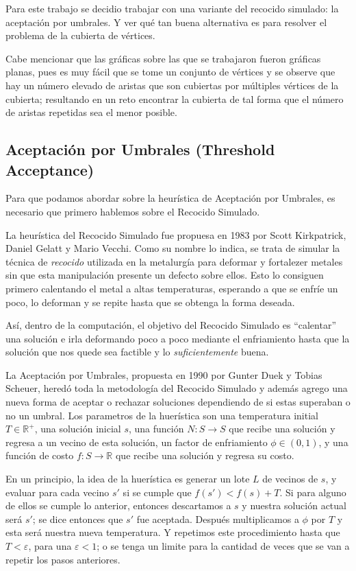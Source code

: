\documentclass{article}
\newcommand{\tit}[1]{\textit{#1}}
\begin{document}
  Para este trabajo se decidio trabajar con una variante del 
  recocido simulado: la aceptación por umbrales. Y ver qué tan
  buena alternativa es para resolver el problema de la cubierta
  de vértices. 

  Cabe mencionar que las gráficas sobre las que se trabajaron fueron 
  gráficas planas, pues es muy fácil que se tome un conjunto de vértices
  y se observe que hay un número elevado de aristas que son cubiertas por 
  múltiples vértices de la cubierta; resultando en un reto encontrar 
  la cubierta de tal forma que el número de aristas repetidas sea el 
  menor posible.

  \subsection{Aceptación por Umbrales (Threshold Acceptance)}
  Para que podamos abordar sobre la heurística de Aceptación por Umbrales,
  es necesario que primero hablemos sobre el Recocido Simulado.

  La heurística del Recocido Simulado fue propuesa en 1983 por
  Scott Kirkpatrick, Daniel Gelatt y Mario Vecchi. Como su nombre
  lo indica, se trata de simular la técnica de \tit{recocido}
  utilizada en la metalurgía para deformar y fortalezer metales sin 
  que esta manipulación presente un defecto sobre ellos. Esto lo 
  consiguen primero calentando el metal a altas temperaturas,
  esperando a que se enfríe un poco, lo deforman y se repite hasta
  que se obtenga la forma deseada.

  Así, dentro de la computación, el objetivo del Recocido Simulado
  es ``calentar'' una solución e irla deformando poco a poco 
  mediante el enfriamiento hasta que la solución que nos quede 
  sea factible y lo \tit{suficientemente} buena.

  La Aceptación por Umbrales, propuesta en 1990 por Gunter Duek y
  Tobias Scheuer, heredó toda la metodología del Recocido
  Simulado y además agrego una nueva forma de aceptar o rechazar
  soluciones dependiendo de si estas superaban o no un umbral.
  Los parametros de la huerística son una temperatura initial 
  $T \in \mathbb{R}^+$, una solución inicial $s$, una función 
  $N: S \rightarrow S$ que recibe una solución y regresa a un vecino 
  de esta solución,  un factor de enfriamiento $\phi \in (0, 1)$, y 
  una función de costo $f: S \rightarrow \mathbb{R}$ que recibe 
  una solución y regresa su costo.

  En un principio, la idea de la huerística es generar un lote $L$
  de vecinos de $s$, y evaluar para cada vecino $s'$ si se 
  cumple que $f(s') < f(s) + T$. Si para alguno de ellos se cumple
  lo anterior, entonces descartamos a $s$ y nuestra solución actual 
  será $s'$; se dice entonces que $s'$ fue aceptada. Después
  multiplicamos a $\phi$ por $T$ y esta será nuestra nueva 
  temperatura. Y repetimos este procedimiento hasta que 
  $T < \varepsilon$, para una $\varepsilon < 1$; o se tenga un 
  limite para la cantidad de veces que se van a repetir los pasos 
  anteriores.
\end{document}
